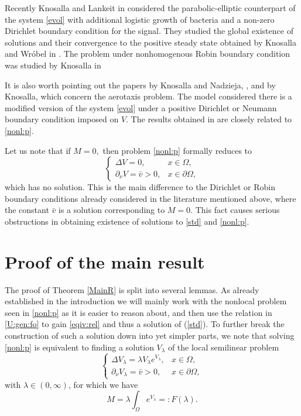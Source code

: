 \documentclass[12pt,a4paper]{amsart}
\theoremstyle{definition}
\theoremstyle{remark}
\numberwithin{equation}{section}
\numberwithin{theorem}{section}
\begin{document}
Recently Knosalla and Lankeit in \cite{KnLa} considered the parabolic-elliptic counterpart of the system \eqref{evol} with additional logistic growth of bacteria and a non-zero Dirichlet boundary condition for the signal. They studied the global existence of solutions and their convergence to the positive steady state obtained by Knosalla and Wr{\'o}bel in \cite{KW}. The problem under nonhomogenous Robin boundary condition was studied by Knosalla in \cite{Knos3} 
%

It is also worth pointing out the papers by Knosalla and Nadzieja, \cite{KNadz}, and by Knosalla, \cite{KNos,Knos1,Knos2} which concern the aerotaxis problem. The model considered there is a modified version of the system \eqref{evol} under a positive Dirichlet or Neumann boundary condition imposed on $V$. The results obtained in \cite{KNadz, Knos2} are closely related to \eqref{nonl:p}.   



 Let us note that if $M=0,$ then problem \eqref{nonl:p} formally reduces to
\begin{equation}\label{V:nonex}
\left\{\begin{array}{lr}
\Delta V=0,& x\in\Omega,\\
\partial_\nu V=\bar{v}>0,& x\in\partial\Omega, 
\end{array}\right.
\end{equation}
which has no solution. This is the main difference to the Dirichlet or Robin boundary conditions already considered in the literature mentioned above, where the constant $\bar{v}$ is a solution corresponding to $M=0$. This fact causes serious obstructions in  obtaining existence of solutions to \eqref{std} and \eqref{nonl:p}.\\
 
%



\section{Proof of the main result} 
The proof of Theorem \ref{MainR} is split into several lemmas. As already established in the introduction we will mainly work with the nonlocal problem seen in \eqref{nonl:p} as it is easier to reason about, and then use the relation in \eqref{U:gen:fo} to gain \eqref{eqiv:rel} and thus a solution of (\ref{std}). To further break the construction of such a solution down into yet simpler parts, we note that solving \eqref{nonl:p} is equivalent to finding a solution $V_\lambda$ of the local semilinear problem
\begin{equation}\label{loc:p}
\left\{\begin{array}{lr}
\Delta V_\lambda=\lambda V_\lambda e^{V_\lambda},& x\in\Omega,\\
\partial_\nu V_\lambda=\bar{v}>0,& x\in\partial\Omega, 
\end{array}\right.
\end{equation}
with $\lambda\in(0,\infty)$, for which we have
\begin{equation}\label{nonl:cond}
M=\lambda\int_\Omega e^{V_\lambda}=:F(\lambda).
\end{equation}
%
\end{document}
